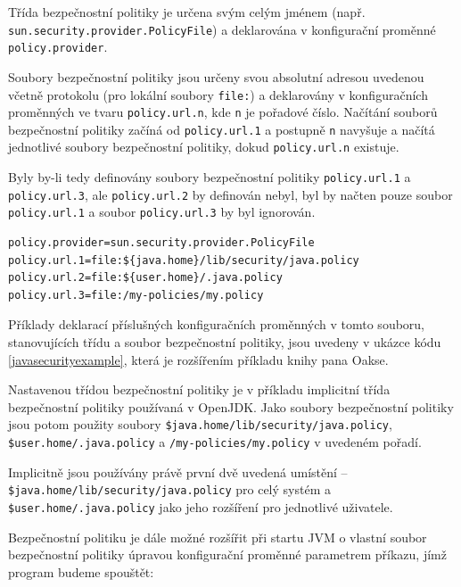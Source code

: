 Třída bezpečnostní politiky je určena svým celým jménem (např. {\tt sun.security.provider.PolicyFile}) a deklarována v konfigurační proměnné {\tt policy.provider}. \cite{refPolicyFiles}

Soubory bezpečnostní politiky jsou určeny svou absolutní adresou uvedenou včetně protokolu (pro lokální soubory {\tt file:}) a deklarovány v konfiguračních proměnných ve tvaru {\tt policy.url.n}, kde {\tt n} je pořadové číslo. Načítání souborů bezpečnostní politiky začíná od {\tt policy.url.1} a postupně {\tt n} navyšuje a načítá jednotlivé soubory bezpečnostní politiky, dokud {\tt policy.url.n} existuje. \cite{refPolicyFiles}

Byly by-li tedy definovány soubory bezpečnostní politiky {\tt policy.url.1} a {\tt policy.url.3}, ale {\tt policy.url.2} by definován nebyl, byl by načten pouze soubor {\tt policy.url.1} a soubor {\tt policy.url.3} by byl ignorován. \cite{refPolicyFiles}

\begin{lstlisting}[caption=Význačnější proměnné konfiguračního souboru {\tt java.security}, label=javasecurityexample]
policy.provider=sun.security.provider.PolicyFile
policy.url.1=file:${java.home}/lib/security/java.policy
policy.url.2=file:${user.home}/.java.policy
policy.url.3=file:/my-policies/my.policy
\end{lstlisting}

Příklady deklarací příslušných konfiguračních proměnných v tomto souboru, stanovujících třídu a soubor bezpečnostní politiky, jsou uvedeny v ukázce kódu \ref{javasecurityexample}, která je rozšířením příkladu knihy pana Oakse\cite[5.3.1]{oaks}.

Nastavenou třídou bezpečnostní politiky je v příkladu implicitní třída bezpečnostní politiky používaná v OpenJDK. Jako soubory bezpečnostní politiky jsou potom použity soubory {\tt \${java.home}/lib/security/java.policy}, {\tt \${user.home}/.java.policy} a {\tt /my-policies/my.policy} v uvedeném pořadí.

Implicitně jsou používány právě první dvě uvedená umístění -- {\tt \${java.home}/lib/security/java.policy} pro celý systém a {\tt \${user.home}/.java.policy} jako jeho rozšíření pro jednotlivé uživatele. \cite{refSecurity}



Bezpečnostní politiku je dále možné rozšířit při startu JVM o vlastní soubor bezpečnostní politiky úpravou konfigurační proměnné parametrem příkazu, jímž program budeme spouštět: \cite[5.3.1]{oaks}

